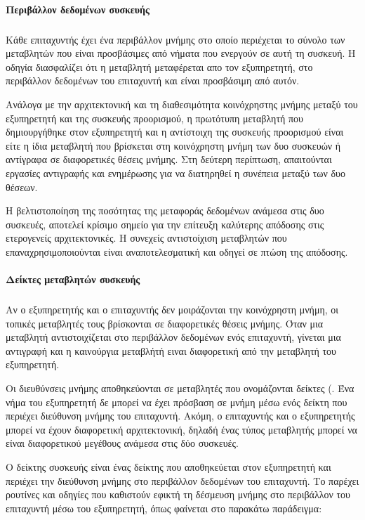 \paragraph{Περιβάλλον δεδομένων συσκευής}
\subparagraph{}
Κάθε επιταχυντής έχει ένα περιβάλλον μνήμης στο οποίο περιέχεται το σύνολο των μεταβλητών που είναι προσβάσιμες από νήματα που ενεργούν σε αυτή τη συσκευή. Η οδηγία \emph{} διασφαλίζει ότι η μεταβλητή μεταφέρεται απο τον εξυπηρετητή, στο περιβάλλον δεδομένων του επιταχυντή και είναι προσβάσιμη από αυτόν.

Ανάλογα με την αρχιτεκτονική και τη διαθεσιμότητα κοινόχρηστης μνήμης μεταξύ του εξυπηρετητή \emph{} και της συσκευής προορισμού, η πρωτότυπη μεταβλητή που δημιουργήθηκε στον εξυπηρετητή και η αντίστοιχη της συσκευής προορισμού είναι είτε η ίδια μεταβλητή που βρίσκεται στη κοινόχρηστη μνήμη των δυο συσκευών ή αντίγραφα σε διαφορετικές θέσεις μνήμης. Στη δεύτερη περίπτωση, απαιτούνται εργασίες αντιγραφής και ενημέρωσης για να διατηρηθεί η συνέπεια μεταξύ των δυο θέσεων.

Η βελτιστοποίηση της ποσότητας της μεταφοράς δεδομένων ανάμεσα στις δυο συσκευές, αποτελεί κρίσιμο σημείο για την επίτευξη καλύτερης απόδοσης στις ετερογενείς αρχιτεκτονικές.
Η συνεχείς αντιστοίχιση μεταβλητών που επαναχρησιμοποιούνται είναι αναποτελεσματική και οδηγεί σε πτώση της απόδοσης.
\clearpage
\paragraph{Δείκτες μεταβλητών συσκευής}
\subparagraph{}
Αν ο εξυπηρετητής και ο επιταχυντής δεν μοιράζονται την κοινόχρηστη μνήμη, οι τοπικές μεταβλητές τους βρίσκονται σε διαφορετικές θέσεις μνήμης. Όταν μια μεταβλητή αντιστοιχίζεται στο περιβάλλον δεδομένων ενός επιταχυντή, γίνεται μια αντιγραφή και η καινούργια μεταβλήτή ειναι διαφορετική από την μεταβλητή του εξυπηρετητή.

Οι διευθύνσεις μνήμης αποθηκεύονται σε μεταβλητές που ονομάζονται δείκτες (\emph{}. Ένα νήμα του εξυπηρετητή δε μπορεί να έχει πρόσβαση σε μνήμη μέσω ενός δείκτη που περιέχει διεύθυνση μνήμης του επιταχυντή. Ακόμη, ο επιταχυντής και ο εξυπηρετητής μπορεί να έχουν διαφορετική αρχιτεκτονική, δηλαδή ένας τύπος μεταβλητής μπορεί να είναι διαφορετικού μεγέθους ανάμεσα στις δύο συσκευές.

Ο δείκτης συσκευής \emph{} είναι ένας δείκτης που αποθηκεύεται στον εξυπηρετητή και περιέχει την διεύθυνση μνήμης στο περιβάλλον δεδομένων του επιταχυντή. Το \emph{} παρέχει ρουτίνες και οδηγίες που καθιστούν εφικτή τη δέσμευση μνήμης στο περιβάλλον του επιταχυντή μέσω του εξυπηρετητή, όπως φαίνεται στο παρακάτω παράδειγμα:


